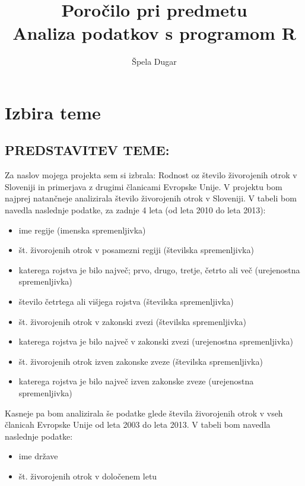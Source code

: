 \documentclass[11pt,a4paper]{article}
\begin{document}
\title{Poročilo pri predmetu \\
Analiza podatkov s programom R}
\author{Špela Dugar}
\maketitle

\section{Izbira teme}

\subsection{PREDSTAVITEV TEME:}
Za naslov mojega projekta sem si izbrala: Rodnost oz število živorojenih otrok v Sloveniji in primerjava z drugimi članicami Evropske Unije.
V projektu bom najprej natančneje analizirala število živorojenih otrok v Sloveniji. V tabeli bom navedla naslednje podatke, za zadnje 4 leta (od leta 2010 do leta 2013):
\begin{itemize}
\item{ime regije (imenska spremenljivka)}
\item{št. živorojenih otrok v posamezni regiji (številska spremenljivka)}
\item{ katerega rojstva je bilo največ; prvo, drugo, tretje, četrto ali več (urejenostna spremenljivka)}
\item{število četrtega ali višjega rojstva (številska spremenljivka)}
\item{št. živorojenih otrok v zakonski zvezi (številska spremenljivka)}
\item{katerega rojstva je bilo največ v zakonski zvezi (urejenostna spremenljivka)}
\item{št. živorojenih otrok izven zakonske zveze (številska spremenljivka)}
\item{katerega rojstva je bilo največ izven zakonske zveze (urejenostna spremenljivka)}
\end{itemize}
Kasneje pa bom analizirala še podatke glede števila živorojenih otrok v vseh članicah Evropske Unije od leta 2003 do leta 2013. V tabeli bom navedla naslednje podatke:
\begin{itemize}
\item{ime države}
\item{št. živorojenih otrok v določenem letu}
\end{itemize}

 
\end{document}
